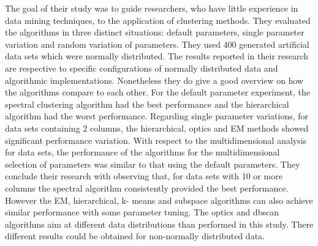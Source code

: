 \documentclass[../main]{subfiles}
\begin{document}
The goal of their study was to guide researchers, who have little experience in data mining techniques, to the application of clustering methods.
They evaluated the algorithms in three distinct situations: default parameters, single parameter variation and random variation of parameters.
They used 400 generated artificial data sets which were normally distributed.
\newline
The results reported in their research are respective to specific configurations of normally distributed data and algorithmic implementations.
Nonetheless they do give a good overview on how the algorithms compare to each other.
\newline
For the default parameter experiment, the spectral clustering algorithm had the best performance and the hierarchical algorithm had the worst performance.
\newline
Regarding single parameter variations, for data sets containing 2 columns, the hierarchical, optics and EM methods showed significant performance variation.
\newline
With respect to the multidimensional analysis for data sets, the performance of the algorithms for the multidimensional selection of parameters was similar to that using the default parameters.
They conclude their research with observing that, for data sets with 10 or more columns the spectral algorithm consistently provided the best performance.
However the EM, hierarchical, k- means and subspace algorithms can also achieve similar performance with some parameter tuning.
The optics and dbscan algorithms aim at different data distributions than performed in this study. There different results could be obtained for non-normally distributed data.
\end{document}
